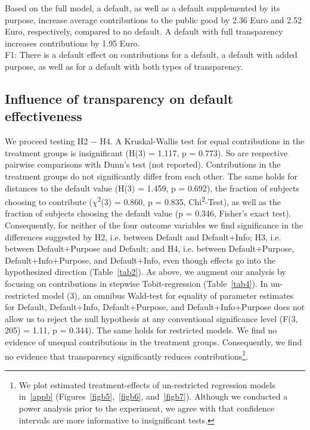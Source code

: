 \documentclass[review, authoryear,12pt]{elsarticle}
\begin{document}
Based on the full model, a default, as well as a default supplemented by its purpose, increase average contributions to the public good by 2.36 Euro and 2.52 Euro, respectively, compared to no default. A default with full transparency increases contributions by 1.95 Euro. \\

F1: There is a default effect on contributions for a default, a default with added purpose, as well as for a default with both types of transparency. \\

\subsection{Influence of transparency on default effectiveness}
We proceed testing H2 $-$ H4. A Kruskal-Wallis test for equal contributions in the treatment groups is insignificant (H(3) = 1.117, p = 0.773). So are respective pairwise comparisons with Dunn's test (not reported). Contributions in the treatment groups do not significantly differ from each other. The same holds for distances to the default value (H(3) = 1.459, p = 0.692), the fraction of subjects choosing to contribute ($\chi$\textsuperscript{2}(3) = 0.860, p = 0.835, Chi\textsuperscript{2}-Test), as well as the fraction of subjects choosing the default value (p = 0.346, Fisher's exact test). Consequently, for neither of the four outcome variables we find significance in the differences suggested by H2, i.e. between Default and Default+Info; H3, i.e. between Default+Purpose and Default; and H4, i.e. between Default+Purpose, Default+Info+Purpose, and Default+Info, even though effects go into the hypothesized direction (Table~\ref{tab2}).
As above, we augment our analysis by focusing on contributions in stepwise Tobit-regression (Table~\ref{tab4}). In un-restricted model (3), an omnibus Wald-test for equality of parameter estimates for Default, Default+Info, Default+Purpose, and Default+Info+Purpose does not allow us to reject the null hypothesis at any conventional significance level (F(3, 205) = 1.11, p = 0.344). The same holds for restricted models. We find no evidence of unequal contributions in the treatment groups. Consequently, we find no evidence that transparency significantly reduces contributions\footnote{We plot estimated treatment-effects of un-restricted regression models in~\ref{appb} (Figures~\ref{figb5},~\ref{figb6}, and~\ref{figb7}). Although we conducted a power analysis prior to the experiment, we agree with \cite{Colegrave.2003} that confidence intervals are more informative to insignificant tests.}. \\
\end{document}
